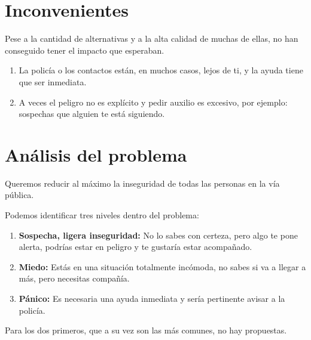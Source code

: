 \section{Inconvenientes}
Pese a la cantidad de alternativas y a la alta calidad de muchas de ellas, no han conseguido tener el impacto que esperaban.
\begin{enumerate}
  \item La policía o los contactos están, en muchos casos, lejos de ti, y la ayuda tiene que ser inmediata.
  \item A veces el peligro no es explícito y pedir auxilio es excesivo, por ejemplo: sospechas que alguien te está siguiendo.
\end{enumerate}

\section{Análisis del problema}
Queremos reducir al máximo la inseguridad de todas las personas en la vía pública.

Podemos identificar tres niveles dentro del problema:
\begin{enumerate}
  \item \textbf{Sospecha, ligera inseguridad:} No lo sabes con certeza, pero algo te pone alerta, podrías estar en peligro y te gustaría estar acompañado.
  \item \textbf{Miedo:} Estás en una situación totalmente incómoda, no sabes si va a llegar a más, pero necesitas compañía.
  \item \textbf{Pánico:} Es necesaria una ayuda inmediata y sería pertinente avisar a la policía.
\end{enumerate}

Para los dos primeros, que a su vez son las más comunes, no hay propuestas.

